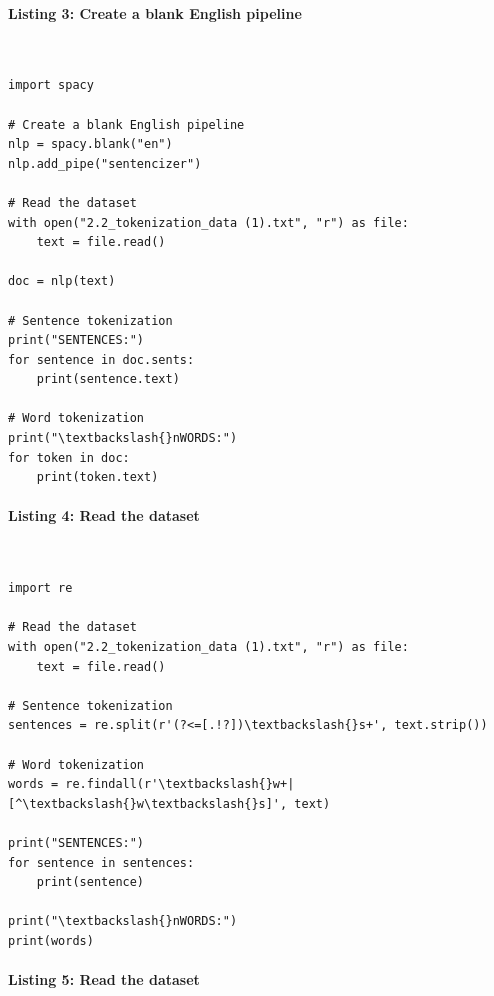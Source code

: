 \documentclass[12pt,a4paper,oneside]{report}
\begin{document}
\paragraph{Listing 3: Create a blank English pipeline}\mbox{}\\[-1ex]
\begin{Verbatim}[commandchars=\\\{\},breaklines=true,breakanywhere=true,fontsize=\scriptsize,frame=leftline,framesep=2mm,rulecolor=\color{gray}]
import spacy

# Create a blank English pipeline
nlp = spacy.blank("en")
nlp.add_pipe("sentencizer")

# Read the dataset
with open("2.2_tokenization_data (1).txt", "r") as file:
    text = file.read()

doc = nlp(text)

# Sentence tokenization
print("SENTENCES:")
for sentence in doc.sents:
    print(sentence.text)

# Word tokenization
print("\textbackslash{}nWORDS:")
for token in doc:
    print(token.text)
\end{Verbatim}
\paragraph{Listing 4: Read the dataset}\mbox{}\\[-1ex]
\begin{Verbatim}[commandchars=\\\{\},breaklines=true,breakanywhere=true,fontsize=\scriptsize,frame=leftline,framesep=2mm,rulecolor=\color{gray}]
import re

# Read the dataset
with open("2.2_tokenization_data (1).txt", "r") as file:
    text = file.read()

# Sentence tokenization
sentences = re.split(r'(?<=[.!?])\textbackslash{}s+', text.strip())

# Word tokenization
words = re.findall(r'\textbackslash{}w+|[^\textbackslash{}w\textbackslash{}s]', text)

print("SENTENCES:")
for sentence in sentences:
    print(sentence)

print("\textbackslash{}nWORDS:")
print(words)
\end{Verbatim}
\paragraph{Listing 5: Read the dataset}\mbox{}\\[-1ex]
\end{document}

